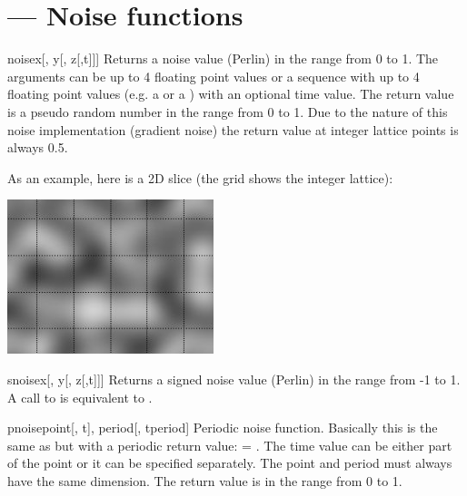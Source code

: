 \section{ ---
         Noise functions}


\begin{funcdesc}{noise}{x[, y[, z[,t]]]}
Returns a noise value (Perlin) in the range from 0 to 1. The arguments
can be up to 4 floating point values or a sequence with up to 4
floating point values (e.g. a  or a ) with an
optional time value. The return value is a pseudo random number in the
range from 0 to 1. Due to the nature of this noise implementation
(gradient noise) the return value at integer lattice points is always 0.5.

As an example, here is a 2D slice (the grid shows the integer lattice):

\begin{center}
\includegraphics[width=6cm]{pics/noise}
\end{center}

\end{funcdesc}

\begin{funcdesc}{snoise}{x[, y[, z[,t]]]}
Returns a signed noise value (Perlin) in the range from -1 to 1. A
call to  is equivalent to .
\end{funcdesc}

\begin{funcdesc}{pnoise}{point[, t], period[, tperiod]}
Periodic noise function. Basically this is the same as
 but with a periodic return value:  =
. The time value can be either part of the point
or it can be specified separately. The point and period must always
have the same dimension. The return value is in the range from 0 to 1.
\end{funcdesc}

